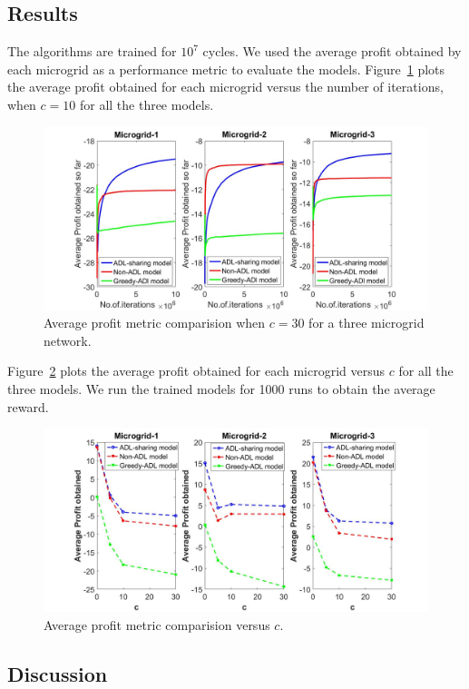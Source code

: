 \subsection{Results}
The algorithms are trained for $10^7$ cycles. We used the average profit obtained by each microgrid as a performance metric to evaluate the models. Figure~\ref{r2} plots the average profit obtained for each microgrid versus the number of iterations, when $c = 10$ for all the three models. 
\begin{figure}[thbp]
	\centering
	\includegraphics[scale = 0.2]{second_plot.jpg}
	\caption{Average profit metric comparision when $c = 30$ for a three microgrid network.}
        \label{r2}
\end{figure}

Figure~\ref{r1} plots the average profit obtained for each microgrid versus $c$ for all the three models. We run the trained models for 1000 runs to obtain the average reward. 
\begin{figure}[thbp]
	\centering
	\includegraphics[scale = 0.2]{first_plot.jpg}
	\caption{Average profit metric comparision versus $c$.}
	 \label{r1}
\end{figure}
\subsection{Discussion}

